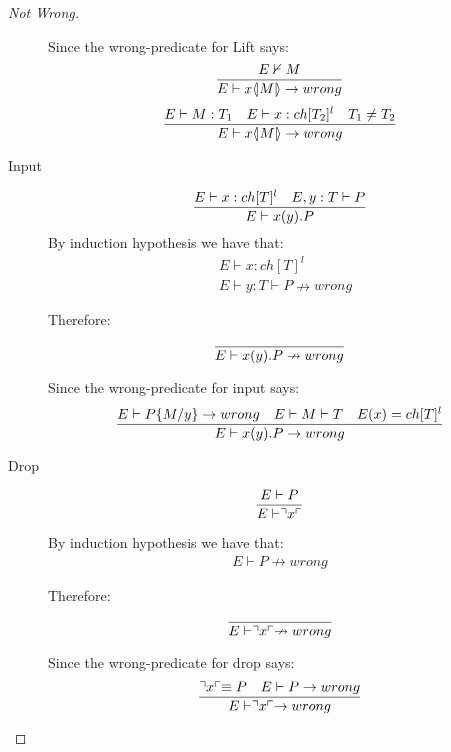 \begin{proof}[Not Wrong]
\begin{description}
		Since the wrong-predicate for Lift says:
		\begin{align*}
		\frac{E \nvdash M}{E \vdash x \langle \! | M | \! \rangle \rightarrow wrong}
		\end{align*}
		\begin{align*}
		\frac{E \vdash M:T_1 \quad E \vdash x:ch[T_2]^l \quad T_1 \neq T_2}{E \vdash x \langle \! | M | \! \rangle \rightarrow wrong}
		\end{align*}
	\item[Input]
		\begin{align*}
		\frac{E \vdash x:ch[T]^l \quad E,y:T \vdash P}{E \vdash x(y).P}
		\end{align*}
		By induction hypothesis we have that:
		\begin{align*}
		&E \vdash x:ch[T]^l\\
		&E \vdash y:T \vdash P \nrightarrow wrong
		\end{align*}
		
		Therefore:
		\begin{align*}
		\frac{}{E \vdash x(y).P \nrightarrow wrong}
		\end{align*}
		
		Since the wrong-predicate for input says:
		\begin{align*}
		\frac{E \vdash P\{M/y\}\rightarrow wrong \quad E\vdash M\vdash T \quad E(x)=ch[T]^l}{E \vdash x(y).P \rightarrow wrong}
		\end{align*}
	\item[Drop]
		\begin{align*}
		\frac{E \vdash P}{E \vdash \urcorner x \ulcorner}
		\end{align*}
		
		By induction hypothesis we have that:
		\begin{align*}
		E \vdash P \nrightarrow wrong
		\end{align*}
		
		Therefore:
		\begin{align*}
		\frac{}{E \vdash \urcorner x \ulcorner \nrightarrow wrong}
		\end{align*}
		
		Since the wrong-predicate for drop says:
		\begin{align*}
		\frac{\urcorner x \ulcorner \equiv P \quad E \vdash P \rightarrow wrong}{E \vdash \urcorner x \ulcorner \rightarrow wrong}
		\end{align*}
		

\end{description}
\end{proof}
